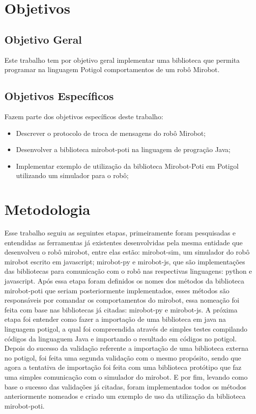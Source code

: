 \section{Objetivos}

\subsection{Objetivo Geral}

Este trabalho tem por objetivo geral implementar uma biblioteca que permita
programar na linguagem Potigol comportamentos de um robô Mirobot.

\subsection{Objetivos Específicos}

Fazem parte dos objetivos específicos deste trabalho:

\begin{itemize} \item Descrever o protocolo de troca de mensagens do robô
    Mirobot; \item Desenvolver a biblioteca mirobot-poti na linguagem de
    progração Java; \item Implementar exemplo de utilização da biblioteca
      Mirobot-Poti em Potigol utilizando um simulador para o robô;
\end{itemize}


\section{Metodologia}

Esse trabalho seguiu as seguintes etapas, primeiramente foram pesquisadas e
entendidas as ferramentas já existentes desenvolvidas pela mesma entidade que
desenvolveu o robô mirobot, entre elas estão: mirobot-sim, um simulador do robô
mirobot escrito em javascript; mirobot-py e mirobot-js, que são implementações
das bibliotecas para comunicação com o robô nas respectivas linguagens: python
e javascript. Após essa etapa foram definidos os nomes dos métodos da
biblioteca mirobot-poti que seriam posteriormente implementados, esses métodos
são responsáveis por comandar os comportamentos do mirobot, essa nomeação foi
feita com base nas bibliotecas já citadas: mirobot-py e mirobot-js. A próxima
etapa foi entender como fazer a importação de uma biblioteca em java na
linguagem potigol, a qual foi compreendida através de simples testes compilando
códigos da linguaguem Java e importando o resultado em códigos no potigol.
Depois do sucesso da validação referente a importação de uma biblioteca externa
no potigol, foi feita uma segunda validação com o mesmo propósito, sendo que
agora a tentativa de importação foi feita com uma biblioteca protótipo que faz
uma simples comunicação com o simulador do mirobot. E por fim, levando como
base o sucesso das validações já citadas, foram implementados todos os métodos
anteriormente nomeados e criado um exemplo de uso da utilização da biblioteca
mirobot-poti.

